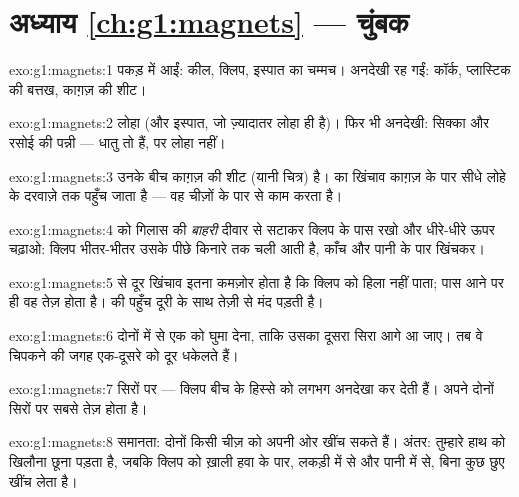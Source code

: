 \section*{अध्याय \ref{ch:g1:magnets} --- चुंबक}

\begin{solution}{exo:g1:magnets:1}
पकड़ में आईं: कील, क्लिप, इस्पात का चम्मच। अनदेखी रह गईं: कॉर्क,
प्लास्टिक की बत्तख, काग़ज़ की शीट।
\end{solution}

\begin{solution}{exo:g1:magnets:2}
लोहा (और इस्पात, जो ज़्यादातर लोहा ही है)। फिर भी अनदेखी: सिक्का और
रसोई की पन्नी --- धातु तो हैं, पर लोहा नहीं।
\end{solution}

\begin{solution}{exo:g1:magnets:3}
उनके बीच काग़ज़ की शीट (यानी चित्र) है।  का खिंचाव काग़ज़ के
पार सीधे लोहे के दरवाज़े तक पहुँच जाता है --- वह चीज़ों के पार से काम
करता है।
\end{solution}

\begin{solution}{exo:g1:magnets:4}
 को गिलास की \emph{बाहरी} दीवार से सटाकर क्लिप के पास रखो और
धीरे-धीरे ऊपर चढ़ाओ: क्लिप भीतर-भीतर उसके पीछे किनारे तक चली आती है,
काँच और पानी के पार खिंचकर।
\end{solution}

\begin{solution}{exo:g1:magnets:5}
 से दूर खिंचाव इतना कमज़ोर होता है कि क्लिप को हिला नहीं पाता;
पास आने पर ही वह तेज़ होता है।  की पहुँच दूरी के साथ तेज़ी से
मंद पड़ती है।
\end{solution}

\begin{solution}{exo:g1:magnets:6}
दोनों में से एक  को घुमा देना, ताकि उसका दूसरा सिरा आगे आ जाए।
तब वे चिपकने की जगह एक-दूसरे को दूर धकेलते हैं।
\end{solution}

\begin{solution}{exo:g1:magnets:7}
सिरों पर --- क्लिप बीच के हिस्से को लगभग अनदेखा कर देती हैं। 
अपने दोनों सिरों पर सबसे तेज़ होता है।
\end{solution}

\begin{solution}{exo:g1:magnets:8}
समानता: दोनों किसी चीज़ को अपनी ओर खींच सकते हैं। अंतर: तुम्हारे हाथ
को खिलौना छूना पड़ता है, जबकि  क्लिप को ख़ाली हवा के पार, लकड़ी
में से और पानी में से, बिना कुछ छुए खींच लेता है।
\end{solution}


